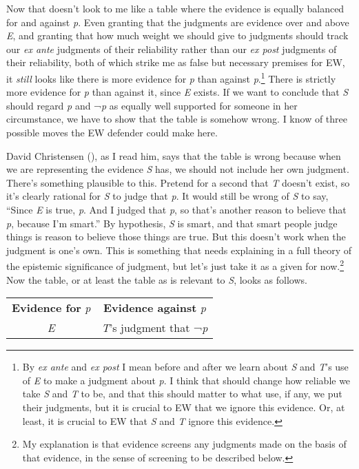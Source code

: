 \documentclass[
  10pt,
  letterpaper,
  DIV=11,
  numbers=noendperiod,
  twoside]{scrartcl}
\begin{document}
Now that doesn't look to me like a table where the evidence is equally
balanced for and against \emph{p}. Even granting that the judgments are
evidence over and above \emph{E}, and granting that how much weight we
should give to judgments should track our \emph{ex ante} judgments of
their reliability rather than our \emph{ex post} judgments of their
reliability, both of which strike me as false but necessary premises for
EW, it \emph{still} looks like there is more evidence for \emph{p} than
against \emph{p}.\footnote{By \emph{ex ante} and \emph{ex post} I mean
  before and after we learn about \emph{S} and \emph{T}'s use of
  \emph{E} to make a judgment about \emph{p}. I think that should change
  how reliable we take \emph{S} and \emph{T} to be, and that this should
  matter to what use, if any, we put their judgments, but it is crucial
  to EW that we ignore this evidence. Or, at least, it is crucial to EW
  that \emph{S} and \emph{T} ignore this evidence.} There is strictly
more evidence for \emph{p} than against it, since \emph{E} exists. If we
want to conclude that \emph{S} should regard \emph{p} and ¬\emph{p} as
equally well supported for someone in her circumstance, we have to show
that the table is somehow wrong. I know of three possible moves the EW
defender could make here.

David Christensen (), as I
read him, says that the table is wrong because when we are representing
the evidence \emph{S} has, we should not include her own judgment.
There's something plausible to this. Pretend for a second that \emph{T}
doesn't exist, so it's clearly rational for \emph{S} to judge that
\emph{p}. It would still be wrong of \emph{S} to say, ``Since \emph{E}
is true, \emph{p}. And I judged that \emph{p}, so that's another reason
to believe that \emph{p}, because I'm smart.'' By hypothesis, \emph{S}
is smart, and that smart people judge things is reason to believe those
things are true. But this doesn't work when the judgment is one's own.
This is something that needs explaining in a full theory of the
epistemic significance of judgment, but let's just take it as a given
for now.\footnote{My explanation is that evidence screens any judgments
  made on the basis of that evidence, in the sense of screening to be
  described below.} Now the table, or at least the table as is relevant
to \emph{S}, looks as follows.

\begin{longtable}[]{@{}cc@{}}
\toprule\noalign{}
\endhead
\bottomrule\noalign{}
\endlastfoot
\textbf{Evidence for} \emph{p} & \textbf{Evidence against} \emph{p} \\
\emph{E} & \emph{T}'s judgment that ¬\emph{p} \\
\end{longtable}
\end{document}
